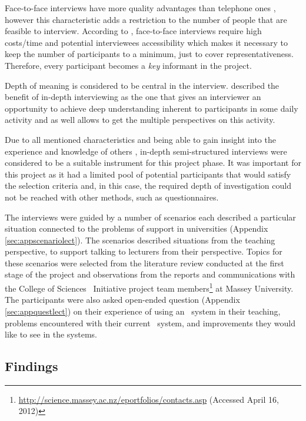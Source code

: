 Face-to-face interviews have more quality advantages than telephone ones
\citep{Shuy2001}, however this characteristic adds a restriction to the number
of people that are feasible to interview. According to \citet{Gillham2000},
face-to-face interviews require high costs/time and potential interviewees
accessibility which makes it necessary to keep the number of participants to a
minimum, just to cover representativeness. Therefore, every participant becomes
a \textit{key} informant in the project.

Depth of meaning is considered to be central in the interview.
\citet{Johnson2001} described the benefit of in-depth interviewing as the one
that gives an interviewer an opportunity to achieve deep understanding inherent
to participants in some daily activity and as well allows to get the multiple
perspectives on this activity.

Due to all mentioned characteristics and being able to gain insight into the
experience and knowledge of others \citep{Schostak2006}, in-depth
semi-structured interviews were considered to be a suitable instrument for this
project phase. It was important for this project as it had a limited pool of 
potential participants that would satisfy the selection criteria and, in this
case, the required depth of investigation could not be reached with other
methods, such as questionnaires.

The interviews were guided by a number of scenarios each described a particular
situation connected to the problems of \LLLs support in universities (Appendix
\ref{sec:appscenariolect}). The scenarios described situations from the teaching
perspective, to support talking to lecturers from their perspective. Topics for
these scenarios were selected from the literature review conducted at the first
stage of the project and observations from the reports and communications with
the College of Sciences \ep~Initiative project team
members\footnote{\url{http://science.massey.ac.nz/eportfolios/contacts.asp}
(Accessed April 16, 2012)} at Massey University. The participants were also asked open-ended question
(Appendix \ref{sec:appquestlect}) on their experience of using an \ep~system in
their teaching, problems encountered with their current \ep~system, and
improvements they would like to see in the systems.

\subsection{Findings}

